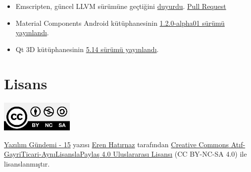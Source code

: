 \documentclass[11pt]{article}
\begin{document}
\begin{itemize}
\item Emscripten, güncel LLVM sürümüne geçtiğini \href{https://groups.google.com/forum/\#!msg/emscripten-discuss/NpxVAOirSl4/cNDszSPkAAAJ}{duyurdu}. \href{https://github.com/emscripten-core/emsdk/pull/373}{Pull Request}
\item Material Components Android kütüphanesinin \href{https://github.com/material-components/material-components-android/releases/tag/1.2.0-alpha01}{1.2.0-alpha01 sürümü yayınlandı}.
\item Qt 3D kütüphanesinin \href{https://www.kdab.com/qt-3d-synchronisation-revisited/}{5.14 sürümü yayınlandı}.
\end{itemize}
\section{Lisans}
\label{sec:org887725d}
\begin{center}
\begin{center}
\includegraphics[height=1.5cm]{../../../img/CC_BY-NC-SA_4.0.png}
\end{center}

\href{yazilim-gundemi-15.pdf}{Yazılım Gündemi - 15} yazısı \href{https://erenhatirnaz.github.io}{Eren Hatırnaz} tarafından \href{http://creativecommons.org/licenses/by-nc-sa/4.0/}{Creative Commons
Atıf-GayriTicari-AynıLisanslaPaylaş 4.0 Uluslararası Lisansı} (CC BY-NC-SA 4.0)
ile lisanslanmıştır.
\end{center}
\end{document}
